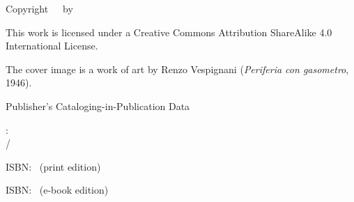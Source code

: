 \bigskip

Copyright\ \textcopyright\ \TheCopyrightYear\ by \TheAuthor

\bigskip

This work is licensed under a Creative Commons Attribution ShareAlike 4.0 International License.

The cover image is a work of art by Renzo Vespignani (\emph{Periferia con gasometro}, 1946).

\bigskip

%

\vspace*{5cm}

\bigskip
Publisher's Cataloging-in-Publication Data

\bigskip
\TheAuthorLNF

\TheMainTitle: \\ \hspace*{10mm}\TheSubTitle / \TheAuthorLNF



ISBN: \PrintISBN\, (print edition) 

ISBN: \EbookISBN\, (e-book edition)

%
\bigskip

	\TheEdition

